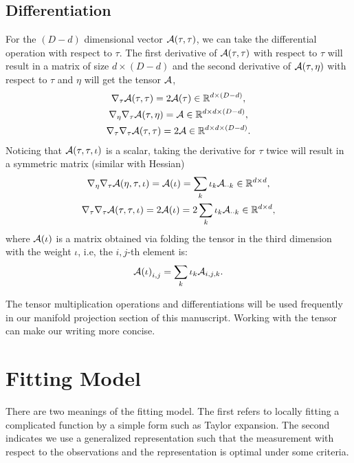 \documentclass[aos,preprint]{imsart}
\theoremstyle{remark}
\begin{document}
\subsection{Differentiation}
For the $(D-d)$ dimensional vector ${\cal A}(\tau,\tau)$, we can take the differential operation with respect to $\tau$. The first derivative of ${\cal A}(\tau,\tau)$ with respect to $\tau$ will result in a matrix of size $d\times (D-d)$ and the second derivative of ${\cal A}(\tau,\eta)$ with respect to $\tau$ and $\eta$ will get the tensor $\cal A$,
\begin{gather*}
\nabla_\tau {\cal A}(\tau,\tau) =  2{\cal A}(\tau) \in \mathbb{R}^{d\times (D-d)},\\
\nabla_\eta \nabla_\tau {\cal A}(\tau,\eta) =  {\cal A}\in  \mathbb{R}^{d\times d\times (D-d)},\\
\nabla_\tau \nabla_\tau {\cal A}(\tau,\tau) =  2{\cal A}\in  \mathbb{R}^{d\times d\times (D-d)}.
\end{gather*}
Noticing that ${\cal A}(\tau,\tau,\iota)$ is a scalar, taking the derivative for $\tau$ twice will result in a symmetric matrix (similar with Hessian)
\begin{gather*}
\nabla_\eta \nabla_\tau {\cal A}(\eta,\tau,\iota) =  {\cal A(\iota)} = \sum_k \iota_k {\cal A}_{\cdot\cdot k}\in \mathbb{R}^{d\times d},\\
\nabla_\tau \nabla_\tau {\cal A}(\tau,\tau,\iota) =  2{\cal A(\iota)} = 2\sum_k \iota_k {\cal A}_{\cdot\cdot k}\in \mathbb{R}^{d\times d},
\end{gather*}
where ${\cal A(\iota)}$ is a matrix obtained via folding the tensor in the third dimension with the weight $\iota$, i.e, the $i,j$-th element is:
\[
{\cal A(\iota)}_{i,j} = \sum_k \iota_k  {\cal A}_{i,j,k}.
\] 

The tensor multiplication operations and differentiations will be used frequently in our manifold projection section of this manuscript. Working with the tensor can make our writing more concise.
\section{Fitting Model}
There are two meanings of the fitting model. The first refers to locally fitting a complicated function by a simple form such as Taylor expansion. The second indicates we use a generalized representation such that the measurement with respect to the observations and the representation is optimal under some criteria.  
\end{document}
